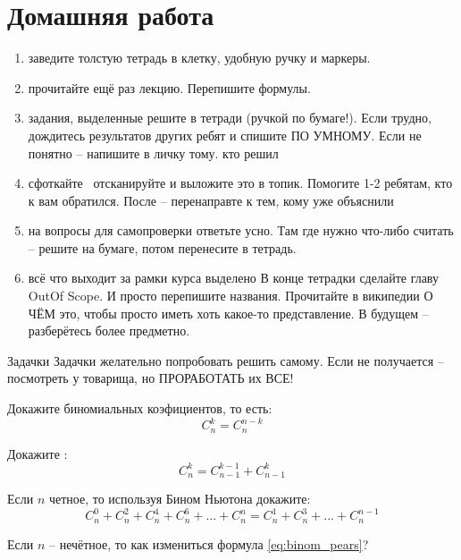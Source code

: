 
\section{Домашняя работа}
\begin{frame}

\small
\begin{enumerate}
 \item заведите толстую тетрадь в клетку, удобную ручку и маркеры.
 \item прочитайте ещё раз лекцию. Перепишите формулы.
 \item задания, выделенные  решите в тетради (ручкой по бумаге!). Если трудно, дождитесь результатов других ребят и спишите ПО УМНОМУ. Если не понятно -- напишите в личку тому. кто решил
 \item сфоткайте \ отсканируйте и выложите это в топик. Помогите 1-2 ребятам, кто к вам обратился. После -- перенаправте к тем, кому уже объяснили
 \item на вопросы для самопроверки ответьте усно. Там где нужно что-либо считать -- решите на бумаге, потом перенесите в тетрадь.
 \item всё что выходит за рамки курса выделено  В конце тетрадки сделайте главу OutOf Scope. И просто перепишите названия. Прочитайте в википедии О ЧЁМ это, чтобы просто иметь хоть какое-то представление. В будущем -- разберётесь более предметно.
\end{enumerate}


\end{frame}

\begin{frame}{Задачки}
Задачки желательно попробовать решить самому.
Если не получается -- посмотреть у товарища, но ПРОРАБОТАТЬ
их ВСЕ!

Докажите  биномиальных коэфициентов, то есть:
\begin{equation}
C_{n}^{k} = C_{n}^{n-k}
\end{equation}

Докажите :
\begin{equation}
C_{n}^{k} = C_{n-1}^{k-1} + C_{n-1}^{k}
\end{equation}

Если $n$ четное, то используя Бином Ньютона докажите:
\begin{equation}\label{eq:binom_pears}
C_n^{0} + C_n^{2} + C_n^{4} + C_n^{6} + ... + C_n^{n} = C_n^{1} + C_n^{3} + ... + C_n^{n-1}
\end{equation}

Если $n$ -- нечётное, то как измениться формула \eqref{eq:binom_pears}?

\end{frame}

